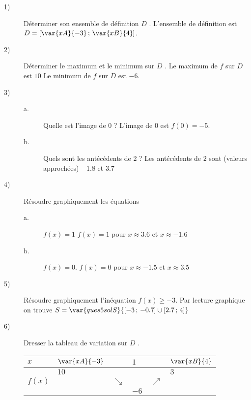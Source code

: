 \begin{description}
\item[1)] 
Déterminer son ensemble de définition $D$ .
L'ensemble de définition est $D = [\var{xA}{-3}\,;\,\var{xB}{4}]$.  %
\item[2)] 
Déterminer le maximum et le minimum sur $D$ .
Le maximum de $f$ sur $D$ est $10$  %
Le minimum de $f$ sur $D$ est $-6$.   %
\item[3)]  
\begin{description}
 \item [a.] 
Quelle est l'image de $0$ ?
 L'image de $0$ est $f(0)=-5$.  %
 \item[b.] 
Quels sont les antécédents de $2$ ?
 Les antécédents de $2$ sont (valeurs approchées) $-1.8$ et $3.7$  %
\end{description}

\item[4)] 
Résoudre graphiquement les équations 
\begin{description}
\item[a.] 
$f(x) = 1$
$f(x) = 1$ pour $x\approx 3.6$ et $x\approx -1.6$  %
\item[b.] 
$f(x) = 0$.
$f(x) = 0$ pour $x\approx -1.5$ et $x\approx 3.5$  %
\end{description}

\item[5)]  
Résoudre graphiquement l'inéquation $f(x)\geq -3$.
Par lecture graphique on trouve $S =\var{ques5solS}{ [-3\,;\,-0.7] \cup  [2.7\,;\,4]}$  %
\item[6)] 
Dresser la tableau de variation sur $D$ .
\begin{center}
\begin{tabular}{|l|lllll|} \hline
$x$ & $\var{xA}{-3}$ &  & $1$ &  & $\var{xB}{4}$\\ \hline
 & $10$ &  &  &  & $3$\\ 
$f(x)$ &  & $\searrow$ &  & $\nearrow$ & \\
 &  &  & $-6$ &  & \\ \hline
\end{tabular}
\end{center}
\end{description}

